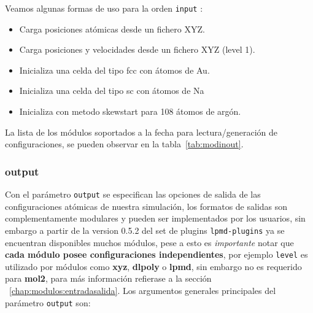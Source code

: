 Veamos algunas formas de uso para la orden \verb|input| :

\begin{itemize}
\item Carga posiciones at\'omicas desde un fichero XYZ.
\item Carga posiciones y velocidades desde un fichero XYZ (level 1).
\item Inicializa una celda del tipo fcc con átomos de Au.
\item Inicializa una celda del tipo sc con átomos de Na
\item Inicializa con metodo skewstart para 108 \'atomos de arg\'on.
\end{itemize}

La lista de los m\'odulos soportados a la fecha para lectura/generaci\'on de configuraciones, se pueden observar en la tabla~\ref{tab:modinout}.

\subsubsection{output}

Con el par\'ametro \verb|output| se especifican las opciones de salida de las configuraciones at\'omicas de nuestra simulaci\'on, los formatos de salidas son complementamente modulares y pueden ser implementados por los usuarios, sin embargo a partir de la version 0.5.2 del set de plugins \verb|lpmd-plugins| ya se encuentran disponibles muchos m\'odulos, pese a esto es \textit{importante} notar que \textbf{cada m\'odulo posee configuraciones independientes}, por ejemplo \verb|level| es utilizado por m\'odulos como \textbf{xyz}, \textbf{dlpoly} o \textbf{lpmd}, sin embargo no es requerido para \textbf{mol2}, para m\'as informaci\'on refierase a la secci\'on ~\ref{chap:modulos:entradasalida}. Los argumentos generales principales del par\'ametro \verb|output| son:


